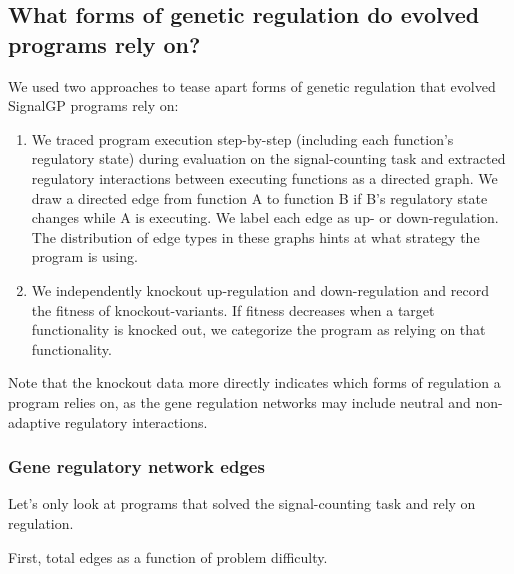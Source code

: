 \documentclass[]{book}
\providecommand{\tightlist}{%
  \setlength{\itemsep}{0pt}\setlength{\parskip}{0pt}}
\begin{document}
\hypertarget{what-forms-of-genetic-regulation-do-evolved-programs-rely-on}{%
\subsection{What forms of genetic regulation do evolved programs rely on?}\label{what-forms-of-genetic-regulation-do-evolved-programs-rely-on}}

We used two approaches to tease apart forms of genetic regulation that evolved SignalGP programs rely on:

\begin{enumerate}
\def\labelenumi{\arabic{enumi}.}
\tightlist
\item
  We traced program execution step-by-step (including each function's regulatory state) during evaluation on the signal-counting task and extracted regulatory interactions between executing functions as a directed graph.
  We draw a directed edge from function A to function B if B's regulatory state changes while A is executing.
  We label each edge as up- or down-regulation. The distribution of edge types in these graphs hints at what strategy the program is using.
\item
  We independently knockout up-regulation and down-regulation and record the fitness of knockout-variants.
  If fitness decreases when a target functionality is knocked out, we categorize the program as relying on that functionality.
\end{enumerate}

Note that the knockout data more directly indicates which forms of regulation a program relies on,
as the gene regulation networks may include neutral and non-adaptive regulatory interactions.

\hypertarget{gene-regulatory-network-edges}{%
\subsubsection{Gene regulatory network edges}\label{gene-regulatory-network-edges}}

Let's only look at programs that solved the signal-counting task and rely on regulation.

First, total edges as a function of problem difficulty.
\end{document}
